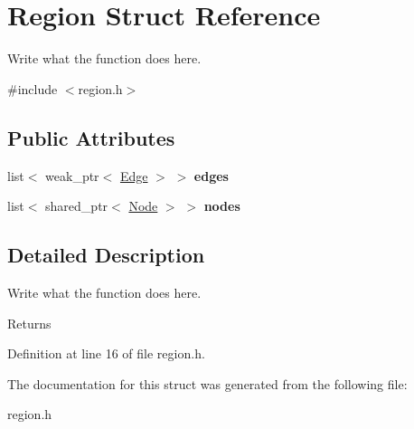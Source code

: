 \hypertarget{structRegion}{\section{Region Struct Reference}
\label{structRegion}
}


Write what the function does here.  




{\ttfamily \#include $<$region.\+h$>$}

\subsection*{Public Attributes}
\begin{DoxyCompactItemize}
\item 
\hypertarget{structRegion_a98be146388a90c0c42ab2d8ba2dd1804}{list$<$ weak\+\_\+ptr$<$ \hyperlink{structEdge}{Edge} $>$ $>$ {\bfseries edges}}\label{structRegion_a98be146388a90c0c42ab2d8ba2dd1804}

\item 
\hypertarget{structRegion_a8a56abfa456673273c9f9f8138c68bdf}{list$<$ shared\+\_\+ptr$<$ \hyperlink{structNode}{Node} $>$ $>$ {\bfseries nodes}}\label{structRegion_a8a56abfa456673273c9f9f8138c68bdf}

\end{DoxyCompactItemize}


\subsection{Detailed Description}
Write what the function does here. 

\begin{DoxyReturn}{Returns}

\end{DoxyReturn}


Definition at line 16 of file region.\+h.



The documentation for this struct was generated from the following file\+:\begin{DoxyCompactItemize}
\item 
region.\+h\end{DoxyCompactItemize}
